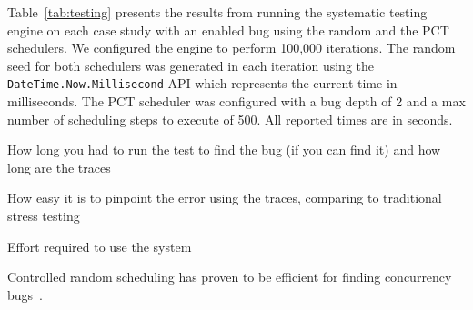Table~\ref{tab:testing} presents the results from running the \psharp systematic testing engine on each case study with an enabled bug using the random and the PCT schedulers. We configured the engine to perform 100,000 iterations. The random seed for both schedulers was generated in each iteration using the \texttt{DateTime.Now.Millisecond} API which represents the current time in milliseconds. The PCT scheduler was configured with a bug depth of 2 and a max number of scheduling steps to execute of 500. All reported times are in seconds.

How long you had to run the test to find the bug (if you can find it) and how long are the traces

How easy it is to pinpoint the error using the \psharp traces, comparing to traditional stress testing

Effort required to use the system

Controlled random scheduling has proven to be efficient for finding concurrency bugs~\cite{thomson2014sct, deligiannis2015psharp}.
